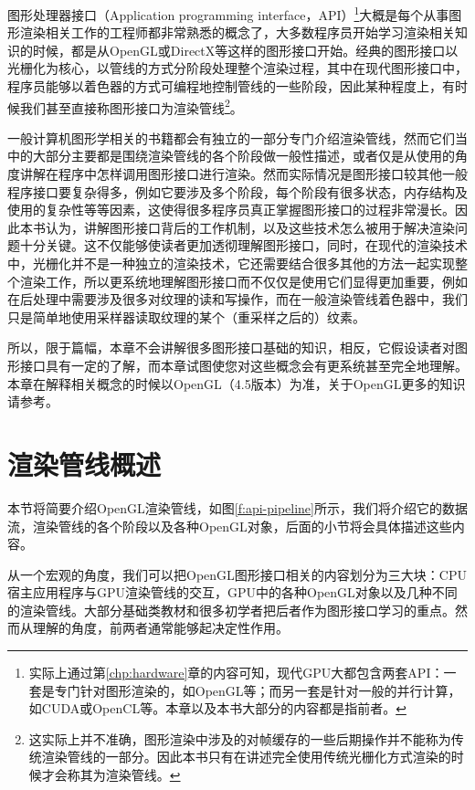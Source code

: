 图形处理器接口（Application programming interface，API）\footnote{实际上通过第\ref{chp:hardware}章的内容可知，现代GPU大都包含两套API：一套是专门针对图形渲染的，如OpenGL等；而另一套是针对一般的并行计算，如CUDA或OpenCL等。本章以及本书大部分的内容都是指前者。}大概是每个从事图形渲染相关工作的工程师都非常熟悉的概念了，大多数程序员开始学习渲染相关知识的时候，都是从OpenGL或DirectX等这样的图形接口开始。经典的图形接口以光栅化为核心，以管线的方式分阶段处理整个渲染过程，其中在现代图形接口中，程序员能够以着色器的方式可编程地控制管线的一些阶段，因此某种程度上，有时候我们甚至直接称图形接口为渲染管线\footnote{这实际上并不准确，图形渲染中涉及的对帧缓存的一些后期操作并不能称为传统渲染管线的一部分。因此本书只有在讲述完全使用传统光栅化方式渲染的时候才会称其为渲染管线。}。

一般计算机图形学相关的书籍都会有独立的一部分专门介绍渲染管线，然而它们当中的大部分主要都是围绕渲染管线的各个阶段做一般性描述，或者仅是从使用的角度讲解在程序中怎样调用图形接口进行渲染。然而实际情况是图形接口较其他一般程序接口要复杂得多，例如它要涉及多个阶段，每个阶段有很多状态，内存结构及使用的复杂性等等因素，这使得很多程序员真正掌握图形接口的过程非常漫长。因此本书认为，讲解图形接口背后的工作机制，以及这些技术怎么被用于解决渲染问题十分关键。这不仅能够使读者更加透彻理解图形接口，同时，在现代的渲染技术中，光栅化并不是一种独立的渲染技术，它还需要结合很多其他的方法一起实现整个渲染工作，所以更系统地理解图形接口而不仅仅是使用它们显得更加重要，例如在后处理中需要涉及很多对纹理的读和写操作，而在一般渲染管线着色器中，我们只是简单地使用采样器读取纹理的某个（重采样之后的）纹素。

所以，限于篇幅，本章不会讲解很多图形接口基础的知识，相反，它假设读者对图形接口具有一定的了解，而本章试图使您对这些概念会有更系统甚至完全地理解。本章在解释相关概念的时候以OpenGL（4.5版本）为准，关于OpenGL更多的知识请参考\cite{b:OpenGLProgrammingGuide:TheOfficialGuidetoLearningOpenGLVersion4.3, b:OpenGL4.5CoreProfile, b:TheOpenGLShadingLanguage}。





\section{渲染管线概述}
本节将简要介绍OpenGL渲染管线，如图\ref{f:api-pipeline}所示，我们将介绍它的数据流，渲染管线的各个阶段以及各种OpenGL对象，后面的小节将会具体描述这些内容。

从一个宏观的角度，我们可以把OpenGL图形接口相关的内容划分为三大块：CPU宿主应用程序与GPU渲染管线的交互，GPU中的各种OpenGL对象以及几种不同的渲染管线。大部分基础类教材和很多初学者把后者作为图形接口学习的重点。然而从理解的角度，前两者通常能够起决定性作用。


